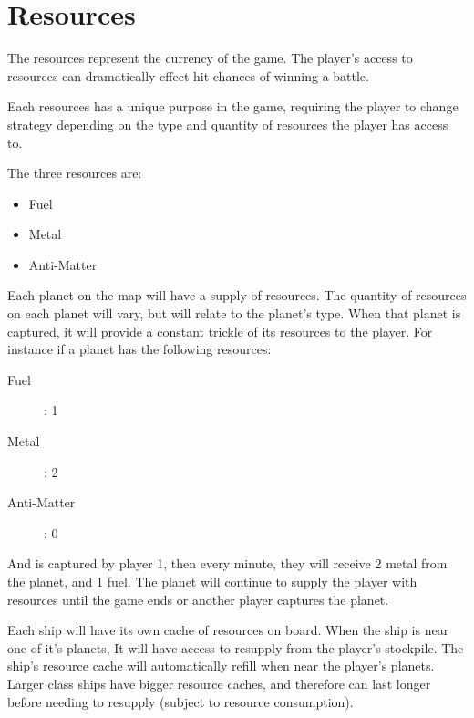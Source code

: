 \section{Resources}

\begin{comment}

what are resources

how they effects the game

for each resources:
  - what it's used for

\end{comment}

The resources represent the currency of the game. The player's access to resources can dramatically effect hit chances of winning a battle.

Each resources has a unique purpose in the game, requiring the player to change strategy depending on the type and quantity of resources the player has access to.

The three resources are:
\begin{itemize}
\item Fuel
\item Metal
\item Anti-Matter
\end{itemize}

Each planet on the map will have a supply of resources. 
The quantity of resources on each planet will vary, but will relate to the planet's type.
When that planet is captured, it will provide a constant trickle of its resources to the player.
For instance if a planet has the following resources:
\begin{description}
\item[Fuel]: 1
\item[Metal]: 2
\item[Anti-Matter]: 0
\end{description}
And is captured by player 1, then every minute, they will receive 2 metal from the planet, and 1 fuel. 
The planet will continue to supply the player with resources until the game ends or another player captures the planet.

Each ship will have its own cache of resources on board.
When the ship is near one of it's planets, It will have access to resupply from the player's stockpile. The ship's resource cache will automatically refill when near the player's planets. 
Larger class ships have bigger resource caches, and therefore can last longer before needing to resupply (subject to resource consumption).

